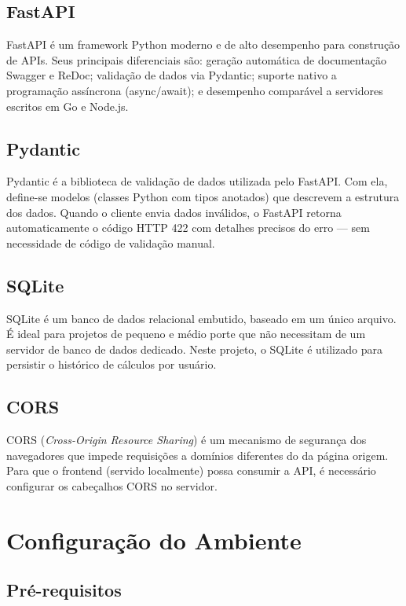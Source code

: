 \documentclass[12pt, a4paper]{article}
\begin{document}
\subsection{FastAPI}

FastAPI é um framework Python moderno e de alto desempenho para construção de APIs. Seus principais diferenciais são: geração automática de documentação Swagger e ReDoc; validação de dados via Pydantic; suporte nativo a programação assíncrona (async/await); e desempenho comparável a servidores escritos em Go e Node.js.

\subsection{Pydantic}

Pydantic é a biblioteca de validação de dados utilizada pelo FastAPI. Com ela, define-se modelos (classes Python com tipos anotados) que descrevem a estrutura dos dados. Quando o cliente envia dados inválidos, o FastAPI retorna automaticamente o código HTTP 422 com detalhes precisos do erro — sem necessidade de código de validação manual.

\subsection{SQLite}

SQLite é um banco de dados relacional embutido, baseado em um único arquivo. É ideal para projetos de pequeno e médio porte que não necessitam de um servidor de banco de dados dedicado. Neste projeto, o SQLite é utilizado para persistir o histórico de cálculos por usuário.

\subsection{CORS}

CORS (\textit{Cross-Origin Resource Sharing}) é um mecanismo de segurança dos navegadores que impede requisições a domínios diferentes do da página origem. Para que o frontend (servido localmente) possa consumir a API, é necessário configurar os cabeçalhos CORS no servidor.

\section{Configuração do Ambiente}

\subsection{Pré-requisitos}
\end{document}
